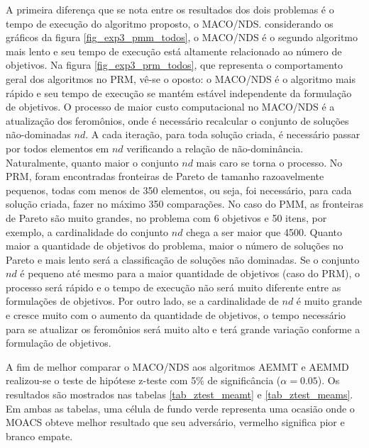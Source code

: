 A primeira diferença que se nota entre os resultados dos dois problemas é o tempo de execução do algoritmo proposto, o MACO/NDS. considerando os gráficos da figura \ref{fig_exp3_pmm_todos}, o MACO/NDS é o segundo algoritmo mais lento e seu tempo de execução está altamente relacionado ao número de objetivos. Na figura \ref{fig_exp3_prm_todos}, que representa o comportamento geral dos algoritmos no PRM, vê-se o oposto: o MACO/NDS é o algoritmo mais rápido e seu tempo de execução se mantém estável independente da formulação de objetivos. O processo de maior custo computacional no MACO/NDS é a atualização dos feromônios, onde é necessário recalcular o conjunto de soluções não-dominadas $nd$. A cada iteração, para toda solução criada, é necessário passar por todos elementos em $nd$ verificando a relação de não-dominância. Naturalmente, quanto maior o conjunto $nd$ mais caro se torna o processo. No PRM, foram encontradas fronteiras de Pareto de tamanho razoavelmente pequenos, todas com menos de 350 elementos, ou seja, foi necessário, para cada solução criada, fazer no máximo 350 comparações. No caso do PMM, as fronteiras de Pareto são muito grandes, no problema com 6 objetivos e 50 itens, por exemplo, a cardinalidade do conjunto $nd$ chega a ser maior que 4500. Quanto maior a quantidade de objetivos do problema, maior o número de soluções no Pareto e mais lento será a classificação de soluções não dominadas. Se o conjunto $nd$ é pequeno até mesmo para a maior quantidade de objetivos (caso do PRM), o processo será rápido e o tempo de execução não será muito diferente entre as formulações de objetivos. Por outro lado, se a cardinalidade de $nd$ é muito grande e cresce muito com o aumento da quantidade de objetivos, o tempo necessário para se atualizar os feromônios será muito alto e terá grande variação conforme a formulação de objetivos.

A fim de melhor comparar o MACO/NDS aos algoritmos AEMMT e AEMMD realizou-se o teste de hipótese z-teste com 5\% de significância ($\alpha=0.05$). Os resultados são mostrados nas tabelas \ref{tab_ztest_meamt} e \ref{tab_ztest_meams}. Em ambas as tabelas, uma célula de fundo verde representa uma ocasião onde o MOACS obteve melhor resultado que seu adversário, vermelho significa pior e branco empate.

